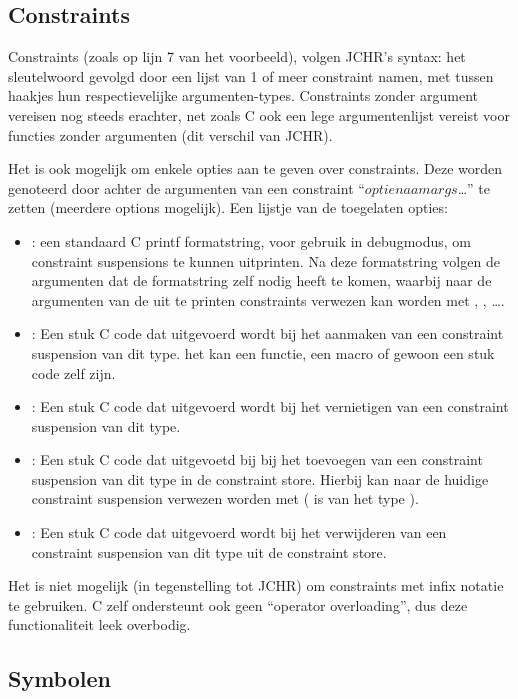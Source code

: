 \subsection{Constraints}

Constraints (zoals op lijn 7 van het voorbeeld), volgen JCHR's syntax: het  sleutelwoord gevolgd door een lijst van 1 of meer constraint namen, met tussen haakjes hun respectievelijke argumenten-types. Constraints zonder argument vereisen nog steeds \code{()} erachter, net zoals C ook een lege argumentenlijst vereist voor functies zonder argumenten (dit verschil van JCHR).

Het is ook mogelijk om enkele opties aan te geven over constraints. Deze worden genoteerd door achter de argumenten van een constraint ``$optienaam$\code{,}$args$\ldots\code{)}'' te zetten (meerdere options mogelijk). Een lijstje van de
toegelaten opties: \begin{itemize}
  \item {}: een standaard C printf formatstring, voor gebruik in debugmodus, om constraint suspensions te kunnen
    uitprinten. Na deze formatstring volgen de argumenten dat de formatstring zelf nodig heeft te komen, waarbij naar de
    argumenten van de uit te printen constraints verwezen kan worden met , , \ldots.
  \item {}: Een stuk C code dat uitgevoerd wordt bij het aanmaken van een constraint suspension van dit type.
    het kan een functie, een macro of gewoon een stuk code zelf zijn.
  \item {}: Een stuk C code dat uitgevoerd wordt bij het vernietigen van een constraint suspension van dit type. 
  \item {}: Een stuk C code dat uitgevoetd bij bij het toevoegen van een constraint suspension van dit type in de
    constraint store. Hierbij kan naar de huidige constraint suspension verwezen worden met  ( is van het type ).
  \item {}: Een stuk C code dat uitgevoerd wordt bij het verwijderen van een constraint suspension van dit type
    uit de constraint store.
\end{itemize}

Het is niet mogelijk (in tegenstelling tot JCHR) om constraints met infix notatie te gebruiken. C zelf ondersteunt ook geen ``operator overloading'', dus deze functionaliteit leek overbodig.

\subsection{Symbolen}

